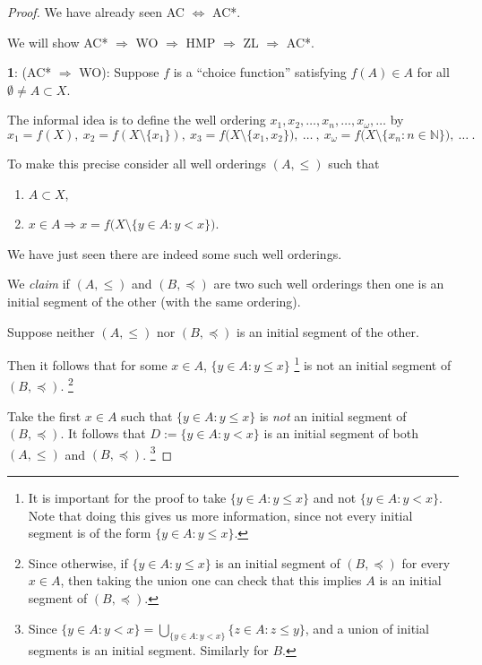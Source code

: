 \documentclass[a4paper]{amsart}
\theoremstyle{plain}
\theoremstyle{definition}
\theoremstyle{remark}
\begin{document}
\begin{proof} We have already seen  AC $  \Longleftrightarrow$  AC*.  

We will show 
AC* $ \Longrightarrow$  WO $ \Longrightarrow$  HMP $ \Longrightarrow$  ZL $ \Longrightarrow$ AC*.

\medskip
\textbf{1}: \noindent (AC* $ \Longrightarrow$  WO):  Suppose $ f $ is a ``choice function'' satisfying $ f(A)\in A $ for all $ \emptyset \neq A \subset X $. 

 The informal idea is to define the well ordering $ x_1, x_2, \dots, x_n , \dots, x_\omega, \dots $ by
\[
x_1= f(X) , \  x_2= f(X\setminus \{x_1\}),\  x_3= f\big(X\setminus \{x_1,x_2\}\big) ,\  \dots\ ,\
  x_\omega =  f\big(X\setminus  \{x_n : n \in \mathbb{N} \}\big), \ \dots \ .
  \]
  
To make this precise consider all well orderings $ (A,\leqslant ) $ such that 
\begin{enumerate}
\item $ A\subset X$,
\item $ x\in A \Longrightarrow x = f\big(X\setminus \{ y \in A : y < x \} \big) $.
\end{enumerate} 
 We have just seen  there are indeed some such well orderings.
 
 We \emph{claim} if $ (A,\leqslant ) $ and $ (B, \preccurlyeq) $ are two such well orderings then one is an initial segment of the other (with the same ordering).   
 
 Suppose neither  $ (A,\leqslant ) $  nor $ (B, \preccurlyeq) $   is   an initial segment of the other.   
 
 Then it follows that for some $ x \in A $,  $ \{y\in A : y\leqslant x \} $%
 \footnote{It is important for the proof to take $ \{y\in A : y\leqslant x \} $ and not $ \{y\in A : y< x \} $.  Note that doing this gives  us more information, since not every initial segment is of the form  $ \{y\in A : y\leqslant x \} $.}
  is not an initial segment of $ (B, \preccurlyeq) $.%
 \footnote{Since otherwise, if $ \{y\in A : y\leqslant x \} $ is an initial segment of $ (B, \preccurlyeq) $ for every $ x \in A $, then taking the union one can check that this implies  $ A $  is an initial segment of $ (B, \preccurlyeq) $.}
 
 Take the first $ x \in A $ such that $ \{y\in A : y\leqslant x \} $ is \emph{not} an initial segment of $ (B, \preccurlyeq) $. It follows that   $ D:= \{y\in A : y< x \} $ is an initial segment of both $ (A,\leqslant ) $ and $ (B, \preccurlyeq) $.%
 \footnote{Since $ \{y\in A : y< x \} = \bigcup_{\{y\in A : y< x \}}  \{z\in A : z\leqslant  y \}$, and a union of initial segments is an initial segment.  Similarly for $ B $.}
 

\end{proof}
\end{document}
